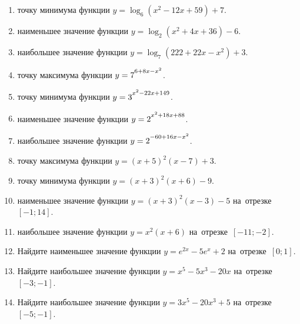 \documentclass[a4paper,10pt]{article}
\begin{document}
\begin{enumerate}
\item {} точку минимума функции $y=\log_6\left(x^2-12x+59\right)+7$.

\item {} наименьшее значение функции $y=\log_2\left(x^2+4x+36\right)-6$.

\item {} наибольшее значение функции $y=\log_7\left(222+22x-x^2\right)+3$.

\item {} точку максимума функции $y=7\strut^{6+8x-x^2}$.

\item {} точку минимума функции $y=3\strut^{x^2-22x+149}$.

\item {} наименьшее значение функции $y=2\strut^{x^2+18x+88}$.

\item {} наибольшее значение функции $y=2\strut^{-60+16x-x^2}$.

\item {} точку максимума функции $y=\left(x+5\right)^2\left(x-7\right)+3$.

\item {} точку минимума функции $y=\left(x+3\right)^2\left(x+6\right)-9$.

\item {} наименьшее значение функции $y=\left(x+3\right)^2\left(x-3\right)-5$ на~отрезке~$\left[-1;14\right]$.

\item {} наибольшее значение функции $y=x^2\left(x+6\right)$ на~отрезке~$\left[-11;-2\right]$.

\item Найдите наименьшее значение функции $y=e^{2x}-5e^x+2$ на~отрезке~$\left[0;1\right]$.

\item Найдите наибольшее значение функции $y=x^5-5x^3-20x$ на~отрезке~$\left[-3;-1\right]$.

\item Найдите наибольшее значение функции $y=3x^5-20x^3+5$ на~отрезке~$\left[-5;-1\right]$.

\end{enumerate}
\end{document}

